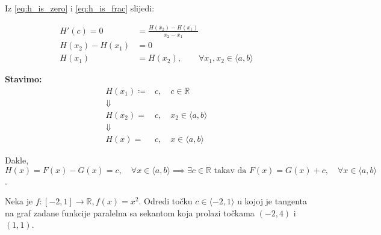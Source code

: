 \begin{multicols}{2}
Iz \ref{eq:h_is_zero} i \ref{eq:h_is_frac} slijedi:

\begin{align*}
H'(c) = 0 &= \frac{H(x_2)-H(x_1)}{x_2-x_1}\\
H(x_2)-H(x_1) &= 0\\
H(x_1) &= H(x_2),\qquad\forall x_1, x_2\in \langle a,b \rangle
\end{align*}

\noindent
\textbf{Stavimo:}
\begin{align*}
    H(x_1)\coloneq& c,\quad c\in\mathbb{R}\\
    \Downarrow&\\
    H(x_2)=&c,\quad x_2\in\langle a,b \rangle\\
    \Downarrow&\\
    H(x)=&c,\quad x\in\langle a,b \rangle
\end{align*}

\noindent
Dakle, $H(x) = F(x)-G(x)=c,\quad\forall x\in \langle a,b \rangle\implies\exists c\in\mathbb{R}\text{ takav da }F(x)=G(x)+c,\quad \forall x\in \langle a,b \rangle$.

\end{multicols}

\begin{example}
    Neka je $f:[-2,1] \to \mathbb{R}, f(x) = x^2$.
    Odredi točku $c\in\langle -2,1 \rangle$ u kojoj je tangenta na graf zadane
    funkcije paralelna sa sekantom koja prolazi točkama $(-2,4)$ i $(1,1)$.
\end{example}
